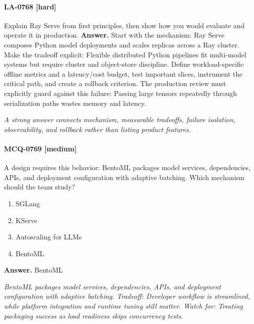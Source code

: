 \paragraph{LA-0768 [hard]} Explain Ray Serve from first principles, then show how you would evaluate and operate it in production.
\noindent\textbf{Answer.} Start with the mechanism: Ray Serve composes Python model deployments and scales replicas across a Ray cluster. Make the tradeoff explicit: Flexible distributed Python pipelines fit multi-model systems but require cluster and object-store discipline. Define workload-specific offline metrics and a latency/cost budget, test important slices, instrument the critical path, and create a rollback criterion. The production review must explicitly guard against this failure: Passing large tensors repeatedly through serialization paths wastes memory and latency.
\par\textit{A strong answer connects mechanism, measurable tradeoffs, failure isolation, observability, and rollback rather than listing product features.}
\paragraph{MCQ-0769 [medium]} A design requires this behavior: BentoML packages model services, dependencies, APIs, and deployment configuration with adaptive batching. Which mechanism should the team study?
\begin{enumerate}[label=\Alph*.]
\item SGLang
\item KServe
\item Autoscaling for LLMs
\item BentoML
\end{enumerate}
\noindent\textbf{Answer.} BentoML
\par\textit{BentoML packages model services, dependencies, APIs, and deployment configuration with adaptive batching. Tradeoff: Developer workflow is streamlined, while platform integration and runtime tuning still matter. Watch for: Treating packaging success as load readiness skips concurrency tests.}
